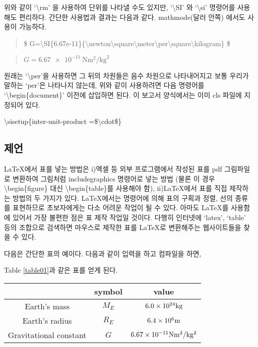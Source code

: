 \documentclass{gshs-report-v1.2}
\begin{document}
위와 같이 `\textbackslash rm' 을 사용하여 단위를 나타낼 수도 있지만,
`\textbackslash SI' 와 `\textbackslash si' 명령어를 사용해도 편리하다. 
간단한 사용법과 결과는 다음과 같다. mathmode(달러 안쪽) 에서도 사용이 가능하다.

\begin{center}
	\begin{quote}
		\$ G=\textbackslash SI\{6.67e-11\}\{\textbackslash newton\textbackslash square\textbackslash meter\textbackslash per\textbackslash square\textbackslash kilogram\} \$
	\end{quote}
	
	\begin{quote}
		$ G=\SI{6.67e-11}{\newton\square\meter\per\square\kilogram} $
	\end{quote}
\end{center}

원래는 `\textbackslash per'을 사용하면 그 뒤의 차원들은 음수 차원으로 나타내어지고 보통 우리가 말하는 `per'은 나타나지 않는데,
위와 같이 사용하려면 다음 명령어를 `\textbackslash begin\{document\}' 이전에 삽입하면 된다.
이 보고서 양식에서는 이미 cls 파일에 지정되어 있다. 
\begin{center}
	\textbackslash sisetup\{inter-unit-product =\$\textbackslash cdot\$\}
\end{center}



\subsection{제언}

\LaTeX 에서 표를 넣는 방법은 i)엑셀 등 외부 프로그램에서 작성된 표를 pdf 그림파일로 변환하여 그림처럼 includegraphics 명령어로 넣는 방법 (물론 이 경우 {\textbackslash}begin\{figure\} 대신 {\textbackslash}begin\{table\}를 사용해야 함), ii)\LaTeX 에서 표를 직접 제작하는 방법의 두 가지가 있다. \LaTeX 에서는 명령어에 의해 표의 구획과 정렬, 선의 종류를 표현하므로 초보자에게는 다소 어려운 작업이 될 수 있다. 아마도 \LaTeX 를 사용함에 있어서 가장 불편한 점은 표 제작 작업일 것이다. 다행히 인터넷에 `latex', `table' 등의 조합으로 검색하면 마우스로 제작한 표를 \LaTeX 로 변환해주는 웹사이트들을 찾을 수 있다.

다음은 간단한 표의 예이다. 다음과 같이 입력을 하고 컴파일을 하면,

Table \ref{table01}과 같은 표를 얻게 된다.
\begin{table}[t]
	\begin{center}
		\begin{tabular}{c|c|c}
			\hline
			& symbol & value \\ \hline
			Earth's mass & $M_E$ & $6.0\times 10^{24} {\rm kg}$ \\
			Earth's radius & $R_E$ & $6.4\times 10^6 {\rm m}$ \\
			Gravitational constant & $G$ & $6.67\times 10^{-11} {\rm N m^2 /kg^2}$ \\ \hline
		\end{tabular}
	\end{center}
\end{table}
\end{document}
